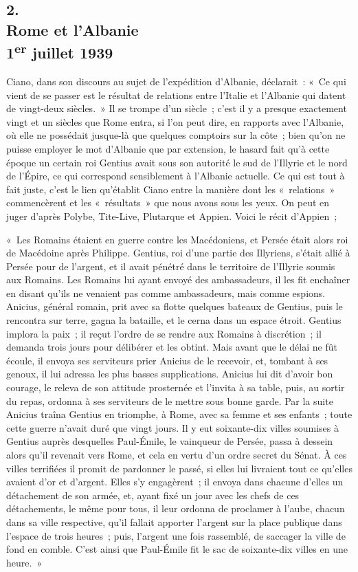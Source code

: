 \documentclass[french,twoside]{book} %
\begin{document}
\subsection[{2. Rome et l’Albanie, 1er juillet 1939}]{2. \\
Rome et l’Albanie \\
1\textsuperscript{er} juillet 1939}
\noindent \par
Ciano, dans son discours au sujet de l'expédition d'Albanie, déclarait : « Ce qui vient de se passer est le résultat de relations entre l'Italie et l'Albanie qui datent de vingt-deux siècles. » Il se trompe d'un siècle ; c'est il y a presque exactement vingt et un siècles que Rome entra, si l'on peut dire, en rapports avec l'Albanie, où elle ne possédait jusque-là que quelques comptoirs sur la côte ; bien qu'on ne puisse employer le mot d'Albanie que par extension, le hasard fait qu'à cette époque un certain roi Gentius avait sous son autorité le sud de l'Illyrie et le nord de l'Épire, ce qui correspond sensiblement à l'Albanie actuelle. Ce qui est tout à fait juste, c'est le lien qu'établit Ciano entre la manière dont les « relations » commencèrent et les « résultats » que nous avons sous les yeux. On peut en juger d'après Polybe, Tite-Live, Plutarque et Appien. Voici le récit d'Appien ;\par
« Les Romains étaient en guerre contre les Macédoniens, et Persée était alors roi de Macédoine après Philippe. Gentius, roi d'une partie des Illyriens, s'était allié à Persée pour de l'argent, et il avait pénétré dans le territoire de l'Illyrie soumis aux Romains. Les Romains lui ayant envoyé des ambassadeurs, il les fit enchaîner en disant qu'ils ne venaient pas comme ambassadeurs, mais comme espions. Anicius, général romain, prit avec sa flotte quelques bateaux de Gentius, puis le rencontra sur terre, gagna la bataille, et le cerna dans un espace étroit. Gentius implora la paix ; il reçut l'ordre de se rendre aux Romains à discrétion ; il demanda trois jours pour délibérer et les obtint. Mais avant que le délai ne fût écoule, il envoya ses serviteurs prier Anicius de le recevoir, et, tombant à ses genoux, il lui adressa les plus basses supplications. Anicius lui dit d'avoir bon courage, le releva de son attitude prosternée et l'invita à sa table, puis, au sortir du repas, ordonna à ses serviteurs de le mettre sous bonne garde. Par la suite Anicius traîna Gentius en triomphe, à Rome, avec sa femme et ses enfants ; toute cette guerre n'avait duré que vingt jours. Il y eut soixante-dix villes soumises à Gentius auprès desquelles Paul-Émile, le vainqueur de Persée, passa à dessein alors qu'il revenait vers Rome, et cela en vertu d'un ordre secret du Sénat. À ces villes terrifiées il promit de pardonner le passé, si elles lui livraient tout ce qu'elles avaient d'or et d'argent. Elles s'y engagèrent ; il envoya dans chacune d'elles un détachement de son armée, et, ayant fixé un jour avec les chefs de ces détachements, le même pour tous, il leur ordonna de proclamer à l'aube, chacun dans sa ville respective, qu'il fallait apporter l'argent sur la place publique dans l'espace de trois heures ; puis, l'argent une fois rassemblé, de saccager la ville de fond en comble. C'est ainsi que Paul-Émile fit le sac de soixante-dix villes en une heure. »\par
\end{document}
